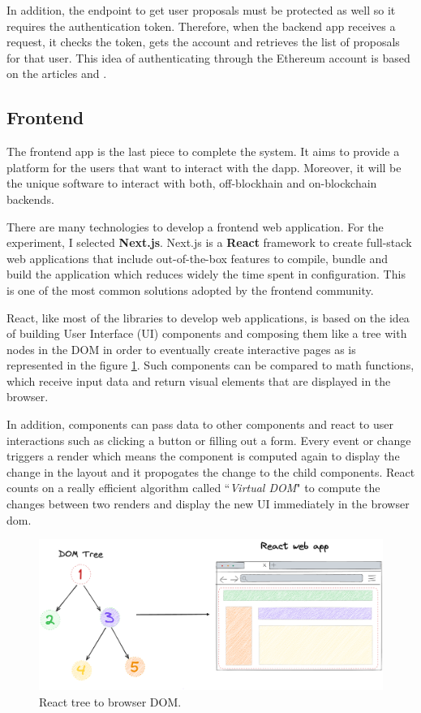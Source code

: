 {{In addition, the endpoint to get user proposals must be protected as well so it requires the authentication token. Therefore, when the backend app receives a request, it checks the token, gets the account and retrieves the list of proposals for that user. This idea of authenticating through the Ethereum account is based on the articles \cite{how-siwe} and \cite{why-siwe}.

}
}

\subsection{Frontend}
{
The frontend app is the last piece to complete the system. It aims to provide a platform for the users that want to interact with the dapp. Moreover, it will be the unique software to interact with both, off-blockhain and on-blockchain backends.

There are many technologies to develop a frontend web application. For the experiment, I selected \textbf{Next.js}. Next.js is a \textbf{React}\cite{reactjs} framework to create full-stack web applications that include out-of-the-box features to compile, bundle and build the application which reduces widely the time spent in configuration. This is one of the most common solutions adopted by the frontend community.

React, like most of the libraries to develop web applications, is based on the idea of building User Interface (UI) components and composing them like a tree with nodes in the DOM in order to eventually create interactive pages as is represented in the figure \ref{fig:react-dom}. Such components can be compared to math functions, which receive input data and return visual elements that are displayed in the browser. 

In addition, components can pass data to other components and react to user interactions such as clicking a button or filling out a form. Every event or change triggers a render which means the component is computed again to display the change in the layout and it propogates the change to the child components. React counts on a really efficient algorithm called ``\textit{Virtual DOM}" to compute the changes between two renders and display the new UI immediately in the browser \Gls{dom}. 

\begin{figure}[H]
\centering
\includegraphics[width=14cm]{img/project-development/react-dom.png}
\caption[React tree to browser DOM]{\footnotesize{React tree to browser DOM.}}
\label{fig:react-dom}
\end{figure}

}
